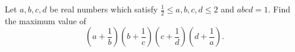 Let $ a,b,c,d$ be real numbers which satisfy $ \frac{1}{2}\leq a,b,c,d\leq 2$ and $ abcd=1$. Find the maximum value of\[ \left(a+\frac{1}{b}\right)\left(b+\frac{1}{c}\right)\left(c+\frac{1}{d}\right)\left(d+\frac{1}{a}\right).\]